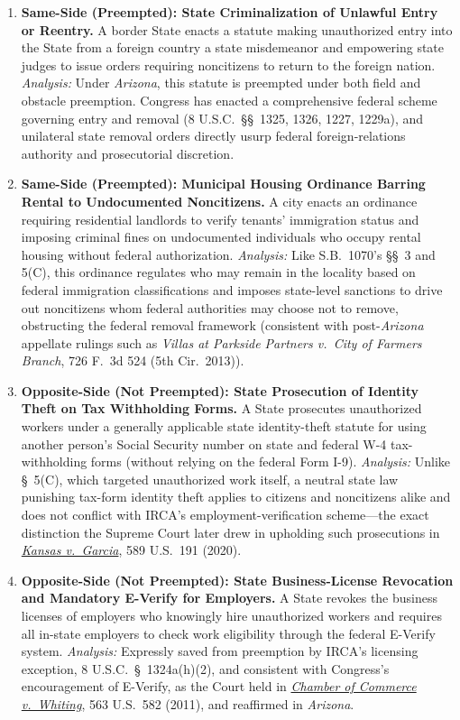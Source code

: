 \documentclass[12pt]{article}
\begin{document}
\begin{enumerate}
\item \textbf{Same-Side (Preempted): State Criminalization of Unlawful Entry or Reentry.} A border State enacts a statute making unauthorized entry into the State from a foreign country a state misdemeanor and empowering state judges to issue orders requiring noncitizens to return to the foreign nation. \textit{Analysis:} Under \textit{Arizona}, this statute is preempted under both field and obstacle preemption. Congress has enacted a comprehensive federal scheme governing entry and removal (8 U.S.C.\ \S\S~1325, 1326, 1227, 1229a), and unilateral state removal orders directly usurp federal foreign-relations authority and prosecutorial discretion.
\item \textbf{Same-Side (Preempted): Municipal Housing Ordinance Barring Rental to Undocumented Noncitizens.} A city enacts an ordinance requiring residential landlords to verify tenants' immigration status and imposing criminal fines on undocumented individuals who occupy rental housing without federal authorization. \textit{Analysis:} Like S.B.\ 1070's \S\S~3 and 5(C), this ordinance regulates who may remain in the locality based on federal immigration classifications and imposes state-level sanctions to drive out noncitizens whom federal authorities may choose not to remove, obstructing the federal removal framework (consistent with post-\textit{Arizona} appellate rulings such as \textit{Villas at Parkside Partners v.\ City of Farmers Branch}, 726 F.\ 3d 524 (5th Cir.\ 2013)).
\item \textbf{Opposite-Side (Not Preempted): State Prosecution of Identity Theft on Tax Withholding Forms.} A State prosecutes unauthorized workers under a generally applicable state identity-theft statute for using another person's Social Security number on state and federal W-4 tax-withholding forms (without relying on the federal Form I-9). \textit{Analysis:} Unlike \S~5(C), which targeted unauthorized work itself, a neutral state law punishing tax-form identity theft applies to citizens and noncitizens alike and does not conflict with IRCA's employment-verification scheme---the exact distinction the Supreme Court later drew in upholding such prosecutions in \href{https://supreme.justia.com/cases/federal/us/589/17-834/}{\textit{Kansas v.\ Garcia}}, 589 U.S.\ 191 (2020).
\item \textbf{Opposite-Side (Not Preempted): State Business-License Revocation and Mandatory E-Verify for Employers.} A State revokes the business licenses of employers who knowingly hire unauthorized workers and requires all in-state employers to check work eligibility through the federal E-Verify system. \textit{Analysis:} Expressly saved from preemption by IRCA's licensing exception, 8 U.S.C.\ \S~1324a(h)(2), and consistent with Congress's encouragement of E-Verify, as the Court held in \href{https://supreme.justia.com/cases/federal/us/563/582/}{\textit{Chamber of Commerce v.\ Whiting}}, 563 U.S.\ 582 (2011), and reaffirmed in \textit{Arizona}.

\end{enumerate}
\end{document}
